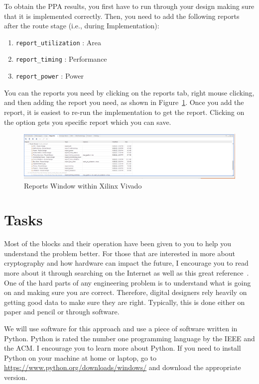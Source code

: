 \documentclass{article}
\begin{document}
To obtain the PPA results, you first have to run through your design
making sure that it is implemented correctly.  Then, you need to add
the following reports after the route stage (i.e., during
Implementation):
\begin{enumerate}
\item \verb!report_utilization! : Area
\item \verb!report_timing! : Performance
\item \verb!report_power! : Power
\end{enumerate}
You can the reports you need by clicking on the reports tab, right
mouse clicking, and then adding the report you need, as shown in
Figure~\ref{reports1.png}.  Once you add the report, it is easiest to
re-run the implementation to get the report.  Clicking on the option
gets you specific report which you can save.
\begin{figure} [b!]
  \centering
  \includegraphics[scale=0.3, width=\columnwidth]{analysis.png}
  \caption{Reports Window within Xilinx Vivado}
  \label{reports1.png}
\end{figure}

  
\section{Tasks}

Most of the blocks and their operation
have been given to you to help you understand the
problem better.
For those that are interested in more about cryptography and how
hardware can impact the future, I encourage you to read more about it
through searching on the Internet as well as this great
reference~\cite{10.5555/1721909}.
One of the hard parts of any engineering problem is
to understand what is going on and making sure you are correct.
Therefore, digital designers rely heavily on getting good data to make
sure they are right.  Typically, this is done either on paper and
pencil or through software.

We will use software for this approach
and use a piece of software written in Python.  Python is rated the
number one programming language by the IEEE and the ACM.  I encourage
you to learn more about Python.
If you need
to install Python on your machine at home or laptop, go to
\url{https://www.python.org/downloads/windows/} and
download the appropriate version.
\end{document}
